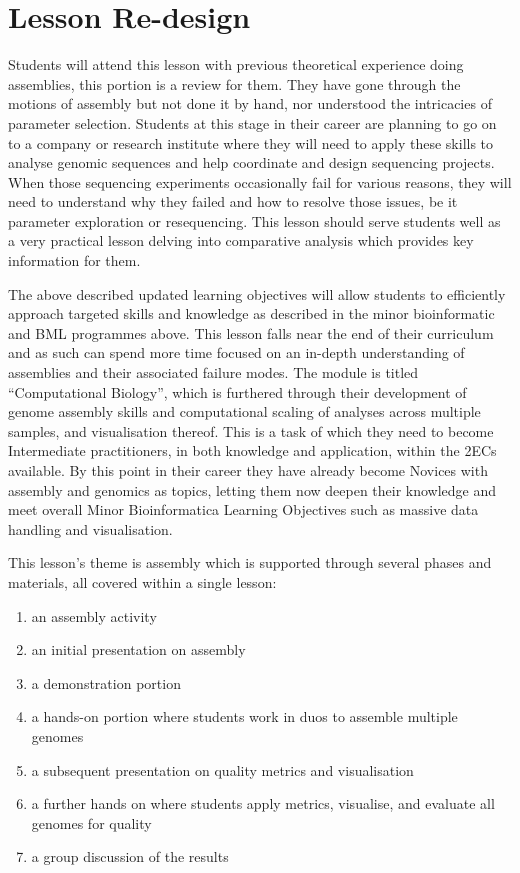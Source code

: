 \documentclass[paper=a4,justified,a4paper]{tufte-handout}
\providecommand{\tightlist}{%
  \setlength{\itemsep}{0pt}\setlength{\parskip}{0pt}}
\begin{document}
\hypertarget{lesson-re-design}{%
\section{Lesson Re-design}\label{lesson-re-design}}

Students will attend this lesson with previous theoretical experience
doing assemblies, this portion is a review for them. They have gone
through the motions of assembly but not done it by hand, nor understood
the intricacies of parameter selection. Students at this stage in their
career are planning to go on to a company or research institute where
they will need to apply these skills to analyse genomic sequences and
help coordinate and design sequencing projects. When those sequencing
experiments occasionally fail for various reasons, they will need to
understand why they failed and how to resolve those issues, be it
parameter exploration or resequencing. This lesson should serve students
well as a very practical lesson delving into comparative analysis which
provides key information for them.

The above described updated learning objectives will allow students to
efficiently approach targeted skills and knowledge as described in the
minor bioinformatic and BML programmes above. This lesson falls near the
end of their curriculum and as such can spend more time focused on an
in-depth understanding of assemblies and their associated failure modes.
The module is titled ``Computational Biology'', which is furthered
through their development of genome assembly skills and computational
scaling of analyses across multiple samples, and visualisation thereof.
This is a task of which they need to become Intermediate practitioners,
in both knowledge and application, within the 2ECs available. By this
point in their career they have already become Novices with assembly and
genomics as topics, letting them now deepen their knowledge and meet
overall Minor Bioinformatica Learning Objectives such as massive data
handling and visualisation.

This lesson's theme is assembly which is supported through several
phases and materials, all covered within a single lesson:

\begin{enumerate}
\def\labelenumi{\arabic{enumi}.}
\tightlist
\item
  an assembly activity
\item
  an initial presentation on assembly
\item
  a demonstration portion
\item
  a hands-on portion where students work in duos to assemble multiple
  genomes
\item
  a subsequent presentation on quality metrics and visualisation
\item
  a further hands on where students apply metrics, visualise, and
  evaluate all genomes for quality
\item
  a group discussion of the results
\end{enumerate}
\end{document}
